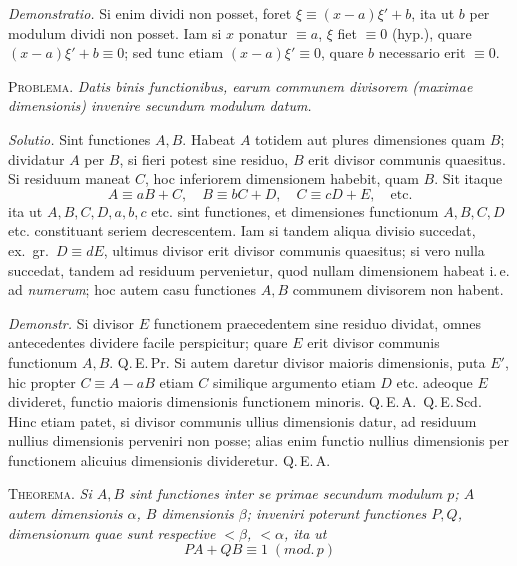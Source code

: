 \emph{Demonstratio.} Si enim dividi non posset, foret $\xi\equiv(x-a)\xi'+b$, ita ut $b$ per modulum dividi non posset. Iam si $x$ ponatur $\equiv a$, $\xi$ fiet $\equiv0$ (hyp.), quare $(x-a)\xi'+b\equiv0$; sed tunc etiam $(x-a)\xi'\equiv0$, quare $b$ necessario erit $\equiv0$.

\textsc{Problema.} \emph{Datis binis functionibus, earum communem divisorem (maximae dimensionis) invenire secundum modulum datum.}

\emph{Solutio.} Sint functiones $A,B$. Habeat $A$ totidem aut plures dimensiones quam $B$; dividatur $A$ per $B$, si fieri potest sine residuo, $B$ erit divisor communis quaesitus. Si residuum maneat $C$, hoc inferiorem dimensionem habebit, quam $B$. Sit itaque
\[
A\equiv aB+C,\quad B\equiv bC+D,\quad C\equiv cD+E,\quad\text{etc.}
\]
ita ut $A,B,C,D,a,b,c$ etc. sint functiones, et dimensiones functionum $A,B,C,D$ etc. constituant seriem decrescentem. Iam si tandem aliqua divisio succedat, ex.\ gr.\ $D\equiv dE$, ultimus divisor erit divisor communis quaesitus; si vero nulla succedat, tandem ad residuum pervenietur, quod nullam dimensionem
%
habeat i.\,e. ad \emph{numerum}; hoc autem casu functiones $A,B$ communem divisorem non habent.

\emph{Demonstr.} Si divisor $E$ functionem praecedentem sine residuo dividat, omnes antecedentes dividere facile perspicitur; quare $E$ erit divisor communis functionum $A,B$. Q.\,E.\,Pr. Si autem daretur divisor maioris dimensionis, puta $E'$, hic propter $C\equiv A-aB$ etiam $C$ similique argumento etiam $D$ etc. adeoque $E$ divideret, functio maioris dimensionis functionem minoris. Q.\,E.\,A.\ Q.\,E.\,Scd. Hinc etiam patet, si divisor communis ullius dimensionis datur, ad residuum nullius dimensionis perveniri non posse; alias enim functio nullius dimensionis per functionem alicuius dimensionis divideretur. Q.\,E.\,A.

\textsc{Theorema.} \emph{Si $A,B$ sint functiones inter se primae secundum modulum $p$; $A$ autem dimensionis $\alpha$, $B$ dimensionis $\beta$; inveniri poterunt functiones $P,Q$, dimensionum quae sunt respective $<\beta$, $<\alpha$, ita ut}
\[
PA+QB\equiv1\;(\mathit{mod.}\,p)
\]

